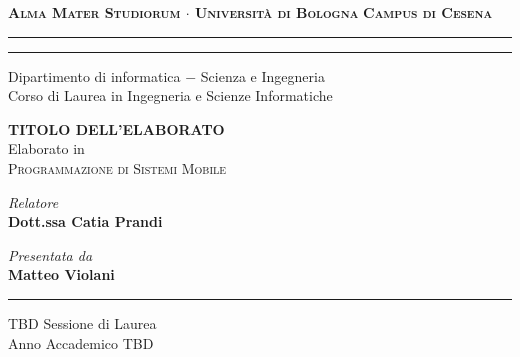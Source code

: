 \begin{titlepage}
    \begin{center}
        {\Large
            \textbf{
                \textsc{Alma Mater Studiorum $\cdot$ Università di Bologna}
            }
        }
        {\large
            \textbf{
                \textsc{Campus di Cesena}
            }
        }
        \rule[0.1cm]{16cm}{0.3mm}
        \rule[0.5cm]{16cm}{0.7mm}
        {\Large
            Dipartimento di informatica $-$ Scienza e Ingegneria \\
        }
        \vspace*{4mm}
        {\Large 
            Corso di Laurea in Ingegneria e Scienze Informatiche
        }
        \vspace*{40mm} %
        \begin{center}
            {\LARGE
                \textbf{
                    TITOLO DELL'ELABORATO \\
                }
            }
            \vspace*{20mm} %
            {\Large Elaborato in} \\
            \vspace*{3mm}
            {\Large
                \textsc{Programmazione di Sistemi Mobile}
            }
        \end{center}
        \vspace*{45mm}
        \begin{minipage}[t]{0.47\textwidth}
            {\large
                \textit{Relatore} \\
                \textbf{Dott.ssa Catia Prandi}
            }
        \end{minipage}
        \begin{minipage}[t]{0.47\textwidth}\raggedleft
            {\large
                \textit{Presentata da} \\
                \textbf{Matteo Violani}
            }
        \end{minipage}
    \end{center}
    \begin{center}
        \vspace*{30mm}
        \rule[0.1cm]{16cm}{0.3mm}
    \end{center}
    \begin{center}
        {\large
            TBD Sessione di Laurea
        } \\
        \vspace*{2mm}
        {\large
            Anno Accademico TBD
        }
    \end{center}
\end{titlepage}
\restoregeometry
